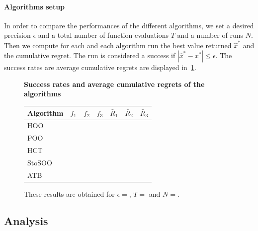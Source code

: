 \documentclass[a4paper,10pt]{article}
\begin{document}
\paragraph{Algorithms setup}
In order to compare the performances of the different algorithms, we set a desired precision $\epsilon$ and a total number of function evaluations $T$ and a number of runs $N$. Then we compute for each and each algorithm run the best value returned $\widehat{x}^*$ and the cumulative regret. The run is considered a success if $|\widehat{x}^*-x^*|\le \epsilon$. The success rates are average cumulative regrets are displayed in~\ref{restab}.

\begin{figure}
\label{restab}
\centering
\textbf{Success rates and average cumulative regrets of the algorithms}
\begin{tabular}{|l|c|c|c|c|c|c|}
\hline
Algorithm & $f_1$ & $f_2$ & $f_3$ & $\bar{R}_1$ & $\bar{R}_2$ & $\bar{R}_3$ \\
\hline
HOO & & & & & &\\
POO & & & & & &\\
HCT & & & & & &\\
StoSOO & & & & & &\\
ATB & & & & & &\\
\hline
\end{tabular}
\caption{These results are obtained for $\epsilon=$, $T=$ and $N=$.}
\end{figure}

\subsection{Analysis}


{}
\nocite{*}

\label{lastpage}
\end{document}
